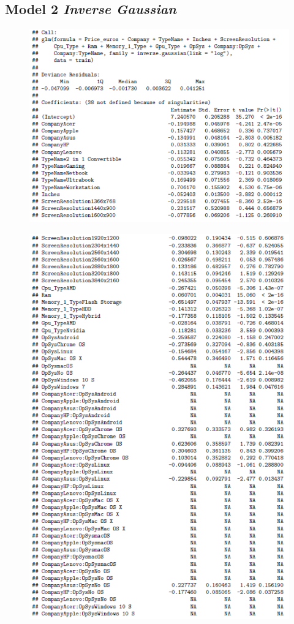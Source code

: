 \documentclass[12pt]{article}
\begin{document}
\subsection{Model 2 \textit{Inverse Gaussian}}
\label{Model_2_Inv}
\begin{figure}[h!]
    \centering
    \includegraphics{Model_4_Sum(1_3).png}
    \label{fig:sum41}
\end{figure}
\begin{figure}[h!]
    \centering
    \includegraphics{Model_4_Sum(2_3).png}
    \label{fig:sum42}
\end{figure}
\end{document}
